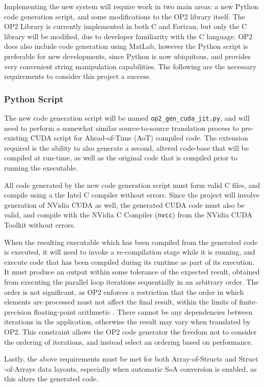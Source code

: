 Implementing the new system will require work in two main areas: a new Python code generation script, and some modifications to the OP2 library itself. The OP2 Library is currently implemented in both C and Fortran, but only the C library will be modified, due to developer familiarity with the C language. OP2 does also include code generation using MatLab, however the Python script is preferable for new developments, since Python is now ubiquitous, and provides very convenient string manipulation capabilities. The following are the necessary requirements to consider this project a success.

\subsubsection{Python Script}
The new code generation script will be named \verb|op2_gen_cuda_jit.py|, and will need to perform a somewhat similar source-to-source translation process to pre-existing CUDA script for Ahead-of-Time (AoT) compiled code. The extension required is the ability to also generate a second, altered code-base that will be compiled at run-time, as well as the original code that is compiled prior to running the executable.
\par
All code generated by the new code generation script must form valid C files, and compile using a the Intel C compiler \cite{icc} without errors. Since the project will involve generation of NVidia CUDA as well, the generated CUDA code must also be valid, and compile with the NVidia C Compiler (\verb|nvcc|) from the NVidia CUDA Toolkit \cite{nvcc,toolkit} without errors.
\par
When the resulting executable which has been compiled from the generated code is executed, it will need to invoke a re-compilation stage while it is running, and execute code that has been compiled during its runtime as part of its execution. It must produce an output within some tolerance of the expected result, obtained from executing the parallel loop iterations sequentially in an arbitrary order. The order is not significant, as OP2 enforces a restriction that the order in which elements are processed must not affect the final result, within the limits of finite-precision floating-point arithmetic \cite[p3]{op2main}. There cannot be any dependencies between iterations in the application, otherwise the result may vary when translated by OP2. This constraint allows the OP2 code generator the freedom not to consider the ordering of iterations, and instead select an ordering based on performance.
\par
Lastly, the above requirements must be met for both Array-of-Structs and Struct\\-of-Arrays data layouts, especially when automatic SoA conversion is enabled, as this alters the generated code.

